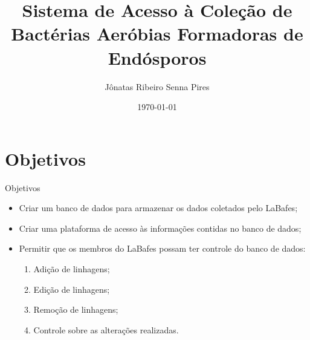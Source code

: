 \documentclass{beamer}
\title{Sistema de Acesso \`a Cole\c{c}\~ao de Bact\'erias Aer\'{o}bias Formadoras de End\'{o}sporos}
\date{\today}
\author{J\^{o}natas Ribeiro Senna Pires}
\institute{Univesidade de Bras\'{i}lia}
\begin{document}
  \maketitle
  \section{Objetivos}
  \begin{frame}{Objetivos}
    \begin{itemize}
        \item Criar um banco de dados para armazenar os dados coletados pelo LaBafes;
        \item Criar uma plataforma de acesso \`as informa\c{c}\~oes contidas no banco de dados;
        \item Permitir que os membros do LaBafes possam ter controle do banco de dados:\\
        \begin{enumerate}
                \item Adi\c{c}\~ao de linhagens;
                \item Edi\c{c}\~ao de linhagens;
                \item Remo\c{c}\~ao de linhagens;
                \item Controle sobre as altera\c{c}\~oes realizadas.
        \end{enumerate}
    \end{itemize}
  \end{frame}
  
\end{document}
